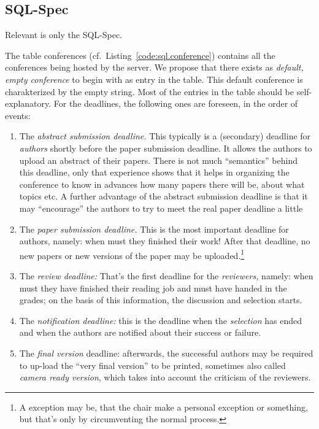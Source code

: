\newpage


\subsection*{SQL-Spec}
\label{sec:sql}
\lstset{basicstyle=\scriptsize,numbers=left,numberstyle=\tiny,stepnumber=5,language=sql}

Relevant is only the SQL-Spec.

%


The table conferences (cf.\ Listing~\ref{code:sql.conference}) contains all
the conferences being hosted by the server. We propose that there exists as
\emph{default, empty conference} to begin with as entry in the table. This
default conference is charakterized by the empty string. Most of the
entries in the table should be self-explanatory. For the deadlines, the
following ones are foreseen, in the order of events:
\begin{enumerate}
\item The \emph{abstract submission deadline.} This typically is a
  (secondary) deadline for \emph{authors} shortly before the paper
  submission deadline.  It allows the authors to upload an abstract of
  their papers. There is not much ``semantics'' behind this deadline, only
  that experience shows that it helps in organizing the conference to know
  in advances how many papers there will be, about what topics etc. A
  further advantage of the abstract submission deadline is that it may
  ``encourage'' the authors to try to meet the real paper deadline a little
\item The \emph{paper submission deadline.} This is the most important
  deadline for authors, namely: when must they finished their work! After
  that deadline, no new papers or new versions of the paper may be
  uploaded.\footnote{A exception may be, that the chair make a personal
    exception or something, but that's only by circumventing the normal
    process.}
\item The \emph{review deadline:} That's the first deadline for the
  \emph{reviewers,} namely: when must they have finished their reading job
  and must have handed in the grades; on the basis of this information, the
  discussion and selection starts.
\item The \emph{notification deadline:} this is the deadline when the
  \emph{selection} has ended and when the authors are notified about their
  success or failure.
\item The \emph{final version} deadline: afterwards, the successful authors
  may be required to up-load the ``very final version'' to be printed,
  sometimes also called \emph{camera ready version}, which takes into
  account the criticism of the reviewers.
\end{enumerate}


